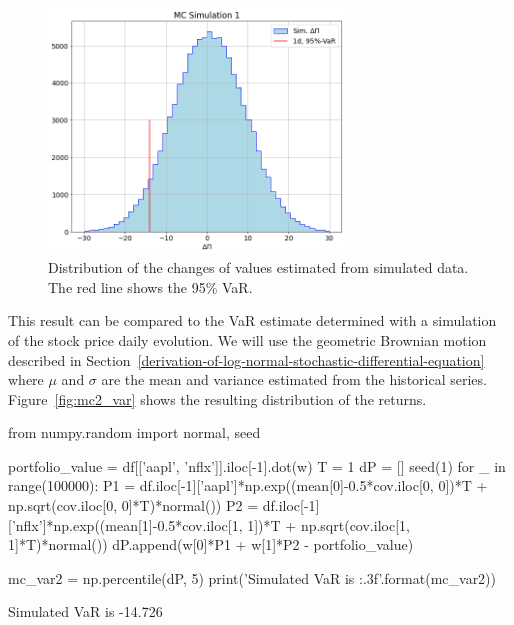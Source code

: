 \begin{figure}[htb]
\centering
\includegraphics[width=0.7\textwidth]{figures/sim1_var}
\caption{Distribution of the changes of values estimated from simulated data. The red line shows the 95\% VaR.}
\label{fig:mc1_var}
\end{figure}

This result can be compared to the VaR estimate determined with a simulation of the stock price daily evolution. We will use the geometric Brownian motion described in Section~\ref{derivation-of-log-normal-stochastic-differential-equation} where $\mu$ and $\sigma$ are the mean and variance estimated from the historical series. Figure~\ref{fig:mc2_var} shows the resulting distribution of the returns.

\begin{ipython}
from numpy.random import normal, seed

portfolio_value = df[['aapl', 'nflx']].iloc[-1].dot(w)
T = 1
dP = []
seed(1)
for _ in range(100000):
  P1 = df.iloc[-1]['aapl']*np.exp((mean[0]-0.5*cov.iloc[0, 0])*T + 
                                   np.sqrt(cov.iloc[0, 0]*T)*normal())
  P2 = df.iloc[-1]['nflx']*np.exp((mean[1]-0.5*cov.iloc[1, 1])*T +
                                   np.sqrt(cov.iloc[1, 1]*T)*normal())
  dP.append(w[0]*P1 + w[1]*P2 - portfolio_value)

mc_var2 = np.percentile(dP, 5)
print('Simulated VaR is {:.3f}'.format(mc_var2))
\end{ipython}
\begin{ioutput}
Simulated VaR is -14.726
\end{ioutput}

